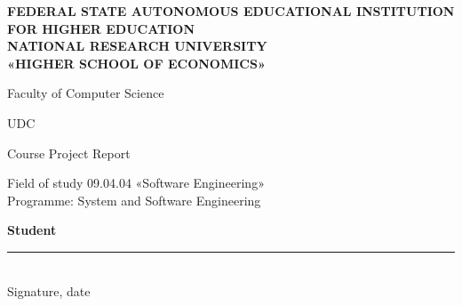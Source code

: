 \begin{titlepage}
\thispagestyle{empty}
\singlespacing
\setlength{\parindent}{0pt}
\setlength{\parskip}{0pt}

\begin{center}
\textbf{FEDERAL STATE AUTONOMOUS EDUCATIONAL INSTITUTION}\\
\textbf{FOR HIGHER EDUCATION}\\
\textbf{NATIONAL RESEARCH UNIVERSITY}\\
\textbf{«HIGHER SCHOOL OF ECONOMICS»}

\vspace{0.3cm}
Faculty of Computer Science
\end{center}

\vspace{0.4cm}
\noindent UDC~\hseUDC

\vspace{2cm}
\begin{center}
{\large\foreignlanguage{russian}{\hseAuthorName}}

\vspace{1.2cm}
{\large\textbf{\hseTitleEn}}

\vspace{0.4cm}
{\foreignlanguage{russian}{\hseTitleRu}}

\vspace{1.2cm}
Course Project Report

\vspace{0.3cm}
Field of study 09.04.04 «Software Engineering»\\
Programme: System and Software Engineering
\end{center}

\vfill
\noindent
\begin{minipage}[t]{0.42\textwidth}
\raggedright
\textbf{Student}\\[0.6cm]
%
\rule{6cm}{0.4pt}\\[-0.1cm]
{\scriptsize Signature, date}


\end{minipage}
\end{titlepage}
